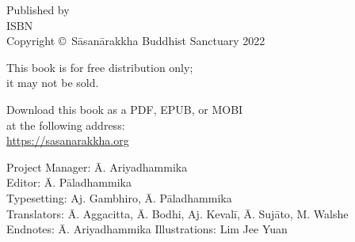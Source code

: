 \cleartoverso
\thispagestyle{empty}

\vspace*{-\baselineskip}

{%

  \ifafiveversion \fontsize{10}{16}\selectfont \fi
  \ifasixversion \fontsize{7.5}{11}\selectfont \fi
  \centering
  \setlength{\parindent}{0pt}%

  \ifafiveversion \vspace{0.5cm} \fi

  Published by \publisher\\
  ISBN \theISBN\\
  Copyright \copyright\ Sāsanārakkha Buddhist Sanctuary 2022

  \ifafiveversion \vspace{0.5cm} \fi
  \ifasixversion \vspace{0.4cm} \fi

  This book is for free distribution only;\\
  it may not be sold.


  \ifafiveversion \vspace{0.5cm} \fi
  \ifasixversion \vspace{0.4cm} \fi

  Download this book as a PDF, EPUB, or MOBI\\
  at the following address:\\
  \href{https://sasanarakkha.org/}{https://sasanarakkha.org}

  \ifafiveversion \vspace{0.5cm} \fi
  \ifasixversion \vspace{0.4cm} \fi

  Project Manager: Ā. Ariyadhammika\\
  Editor: Ā. Pāladhammika\\
  Typesetting: Aj. Gambhiro, Ā. Pāladhammika\\
  Translators: Ā. Aggacitta, Ā. Bodhi, Aj. Kevalī, Ā. Sujāto, M. Walshe\\
  Endnotes: Ā. Ariyadhammika
  Illustrations: Lim Jee Yuan



  \ifafiveversion \vspace{0.5cm} \fi
  \ifasixversion \vspace{0.4cm} \fi

}
